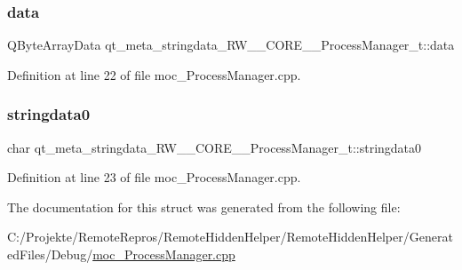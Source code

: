 \subsubsection{\texorpdfstring{data}{data}}
{\footnotesize\ttfamily Q\+Byte\+Array\+Data qt\+\_\+meta\+\_\+stringdata\+\_\+\+R\+W\+\_\+\+\_\+\+C\+O\+R\+E\+\_\+\+\_\+\+Process\+Manager\+\_\+t\+::data}



Definition at line 22 of file moc\+\_\+\+Process\+Manager.\+cpp.

\hypertarget{structqt__meta__stringdata___r_w_____c_o_r_e_____process_manager__t_a2ab1016f5cce35de3db06dd2503c6ead}{}\label{structqt__meta__stringdata___r_w_____c_o_r_e_____process_manager__t_a2ab1016f5cce35de3db06dd2503c6ead} 
\subsubsection{\texorpdfstring{stringdata0}{stringdata0}}
{\footnotesize\ttfamily char qt\+\_\+meta\+\_\+stringdata\+\_\+\+R\+W\+\_\+\+\_\+\+C\+O\+R\+E\+\_\+\+\_\+\+Process\+Manager\+\_\+t\+::stringdata0}



Definition at line 23 of file moc\+\_\+\+Process\+Manager.\+cpp.



The documentation for this struct was generated from the following file\+:\begin{DoxyCompactItemize}
\item 
C\+:/\+Projekte/\+Remote\+Repros/\+Remote\+Hidden\+Helper/\+Remote\+Hidden\+Helper/\+Generated\+Files/\+Debug/\hyperlink{_debug_2moc___process_manager_8cpp}{moc\+\_\+\+Process\+Manager.\+cpp}\end{DoxyCompactItemize}
